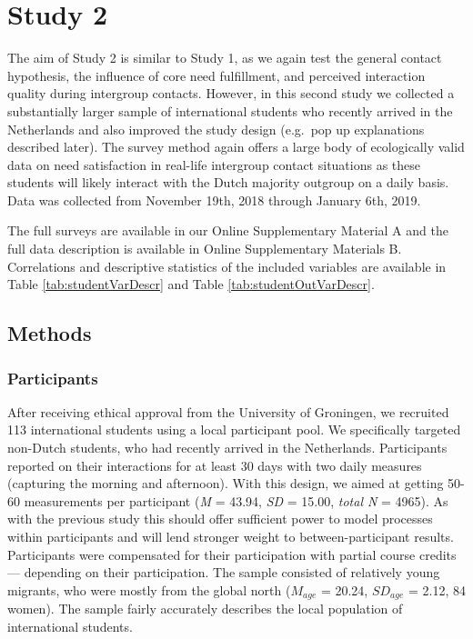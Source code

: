 \section{Study 2}

The aim of Study 2 is similar to Study 1, as we again test the general
contact hypothesis, the influence of core need fulfillment, and
perceived interaction quality during intergroup contacts. However, in
this second study we collected a substantially larger sample of
international students who recently arrived in the Netherlands and also
improved the study design (e.g.~pop up explanations described later).
The survey method again offers a large body of ecologically valid data
on need satisfaction in real-life intergroup contact situations as these
students will likely interact with the Dutch majority outgroup on a
daily basis. Data was collected from November 19th, 2018 through January
6th, 2019.

The full surveys are available in our Online Supplementary Material A
and the full data description is available in Online Supplementary
Materials B. Correlations and descriptive statistics of the included
variables are available in Table \ref{tab:studentVarDescr} and Table
\ref{tab:studentOutVarDescr}.

\subsection{Methods}

\subsubsection{Participants}

After receiving ethical approval from the University of Groningen, we
recruited 113 international students using a local participant pool. We
specifically targeted non-Dutch students, who had recently arrived in
the Netherlands. Participants reported on their interactions for at
least 30 days with two daily measures (capturing the morning and
afternoon). With this design, we aimed at getting 50-60 measurements per
participant (\textit{M} = 43.94, \textit{SD} = 15.00, \textit{total N} =
4965). As with the previous study this should offer sufficient power to
model processes within participants and will lend stronger weight to
between-participant results. Participants were compensated for their
participation with partial course credits --- depending on their
participation. The sample consisted of relatively young migrants, who
were mostly from the global north (\(M_{age}\) = 20.24, \(SD_{age}\) =
2.12, 84 women). The sample fairly accurately describes the local
population of international students.

